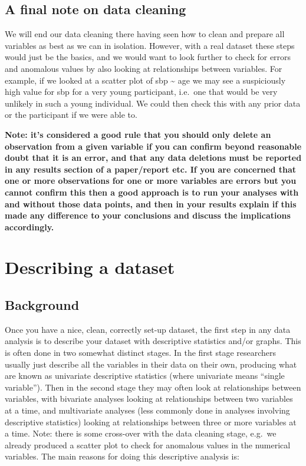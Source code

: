 \documentclass[
]{book}
\begin{document}
\hypertarget{a-final-note-on-data-cleaning}{%
\section{A final note on data cleaning}\label{a-final-note-on-data-cleaning}}

We will end our data cleaning there having seen how to clean and prepare all variables as best as we can in isolation. However, with a real dataset these steps would just be the basics, and we would want to look further to check for errors and anomalous values by also looking at relationships between variables. For example, if we looked at a scatter plot of sbp \textasciitilde{} age we may see a suspiciously high value for sbp for a very young participant, i.e.~one that would be very unlikely in such a young individual. We could then check this with any prior data or the participant if we were able to.

\textbf{Note: it's considered a good rule that you should only delete an observation from a given variable if you can confirm beyond reasonable doubt that it is an error, and that any data deletions must be reported in any results section of a paper/report etc. If you are concerned that one or more observations for one or more variables are errors but you cannot confirm this then a good approach is to run your analyses with and without those data points, and then in your results explain if this made any difference to your conclusions and discuss the implications accordingly.}

\hypertarget{describing-a-dataset}{%
\chapter{Describing a dataset}\label{describing-a-dataset}}

\hypertarget{background}{%
\section{Background}\label{background}}

Once you have a nice, clean, correctly set-up dataset, the first step in any data analysis is to describe your dataset with descriptive statistics and/or graphs. This is often done in two somewhat distinct stages. In the first stage researchers usually just describe all the variables in their data on their own, producing what are known as univariate descriptive statistics (where univariate means ``single variable''). Then in the second stage they may often look at relationships between variables, with bivariate analyses looking at relationships between two variables at a time, and multivariate analyses (less commonly done in analyses involving descriptive statistics) looking at relationships between three or more variables at a time. Note: there is some cross-over with the data cleaning stage, e.g.~we already produced a scatter plot to check for anomalous values in the numerical variables. The main reasons for doing this descriptive analysis is:
\end{document}
